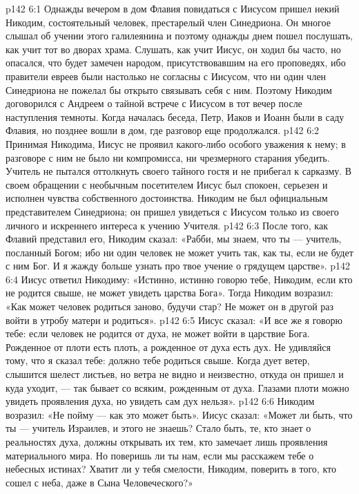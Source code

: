 \vs p142 6:1 Однажды вечером в дом Флавия повидаться с Иисусом пришел некий Никодим, состоятельный человек, престарелый член Синедриона. Он многое слышал об учении этого галилеянина и поэтому однажды днем пошел послушать, как учит тот во дворах храма. Слушать, как учит Иисус, он ходил бы часто, но опасался, что будет замечен народом, присутствовавшим на его проповедях, ибо правители евреев были настолько не согласны с Иисусом, что ни один член Синедриона не пожелал бы открыто связывать себя с ним. Поэтому Никодим договорился с Андреем о тайной встрече с Иисусом в тот вечер после наступления темноты. Когда началась беседа, Петр, Иаков и Иоанн были в саду Флавия, но позднее вошли в дом, где разговор еще продолжался.
\vs p142 6:2 Принимая Никодима, Иисус не проявил какого\hyp{}либо особого уважения к нему; в разговоре с ним не было ни компромисса, ни чрезмерного старания убедить. Учитель не пытался оттолкнуть своего тайного гостя и не прибегал к сарказму. В своем обращении с необычным посетителем Иисус был спокоен, серьезен и исполнен чувства собственного достоинства. Никодим не был официальным представителем Синедриона; он пришел увидеться с Иисусом только из своего личного и искреннего интереса к учению Учителя.
\vs p142 6:3 После того, как Флавий представил его, Никодим сказал: «Рабби, мы знаем, что ты --- учитель, посланный Богом; ибо ни один человек не может учить так, как ты, если не будет с ним Бог. И я жажду больше узнать про твое учение о грядущем царстве».
\vs p142 6:4 Иисус ответил Никодиму: «Истинно, истинно говорю тебе, Никодим, если кто не родится свыше, не может увидеть царства Бога». Тогда Никодим возразил: «Как может человек родиться заново, будучи стар? Не может он в другой раз войти в утробу матери и родиться».
\vs p142 6:5 Иисус сказал: «И все же я говорю тебе: если человек не родится от духа, не может войти в царствие Бога. Рожденное от плоти есть плоть, а рожденное от духа есть дух. Не удивляйся тому, что я сказал тебе: должно тебе родиться свыше. Когда дует ветер, слышится шелест листьев, но ветра не видно и неизвестно, откуда он пришел и куда уходит, --- так бывает со всяким, рожденным от духа. Глазами плоти можно увидеть проявления духа, но увидеть сам дух нельзя».
\vs p142 6:6 Никодим возразил: «Не пойму --- как это может быть». Иисус сказал: «Может ли быть, что ты --- учитель Израилев, и этого не знаешь? Стало быть, те, кто знает о реальностях духа, должны открывать их тем, кто замечает лишь проявления материального мира. Но поверишь ли ты нам, если мы расскажем тебе о небесных истинах? Хватит ли у тебя смелости, Никодим, поверить в того, кто сошел с неба, даже в Сына Человеческого?»

